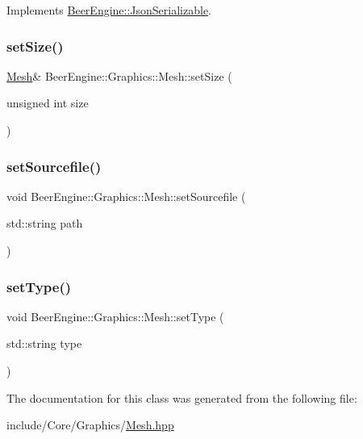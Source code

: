 Implements \mbox{\hyperlink{class_beer_engine_1_1_json_serializable_a17689cbd8fe282c570bd026cc1be5b3b}{Beer\+Engine\+::\+Json\+Serializable}}.

\mbox{\label{class_beer_engine_1_1_graphics_1_1_mesh_ad149bbda494d7043fe49de9571534f03}} 
\subsubsection{\texorpdfstring{set\+Size()}{setSize()}}
{\footnotesize\ttfamily \mbox{\hyperlink{class_beer_engine_1_1_graphics_1_1_mesh}{Mesh}}\& Beer\+Engine\+::\+Graphics\+::\+Mesh\+::set\+Size (\begin{DoxyParamCaption}\item[{unsigned int}]{size }\end{DoxyParamCaption})}

\mbox{\label{class_beer_engine_1_1_graphics_1_1_mesh_a9c0d91380cd84b6850e850ed9b4d61ed}} 
\subsubsection{\texorpdfstring{set\+Sourcefile()}{setSourcefile()}}
{\footnotesize\ttfamily void Beer\+Engine\+::\+Graphics\+::\+Mesh\+::set\+Sourcefile (\begin{DoxyParamCaption}\item[{std\+::string}]{path }\end{DoxyParamCaption})}

\mbox{\label{class_beer_engine_1_1_graphics_1_1_mesh_a296b58a337dab85843a69f1dced68125}} 
\subsubsection{\texorpdfstring{set\+Type()}{setType()}}
{\footnotesize\ttfamily void Beer\+Engine\+::\+Graphics\+::\+Mesh\+::set\+Type (\begin{DoxyParamCaption}\item[{std\+::string}]{type }\end{DoxyParamCaption})}



The documentation for this class was generated from the following file\+:\begin{DoxyCompactItemize}
\item 
include/\+Core/\+Graphics/\mbox{\hyperlink{_mesh_8hpp}{Mesh.\+hpp}}\end{DoxyCompactItemize}
